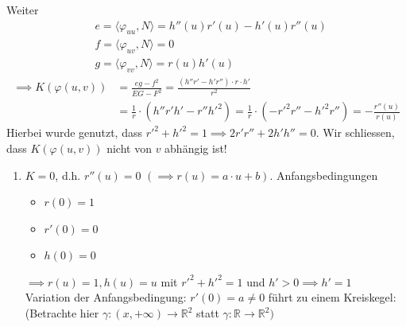 \documentclass[../main.tex]{subfiles}
\begin{document}
Weiter \begin{align*}
    &e = \langle\varphi_{uu},N\rangle = h''(u)r'(u)-h'(u)r''(u)\\
    &f = \langle\varphi_{uv},N\rangle = 0\\
    &g = \langle\varphi_{vv},N\rangle = r(u)h'(u)
\end{align*}
\begin{align*}
    \implies K(\varphi(u,v)) &= \frac{eg-f^{2}}{EG-F^{2}} = \frac{(h''r'-h'r'')\cdot r\cdot h'}{r^{2}}\\
    &= \frac{1}{r}\cdot (h''r'h'-r''h'^{2}) = \frac{1}{r}\cdot (-r'^{2}r''-h'^{2}r'') = -\frac{r''(u)}{r(u)}
\end{align*}
Hierbei wurde genutzt, dass $r'^{2} + h'^{2} = 1 \implies 2r'r'' + 2h'h'' = 0$. 
Wir schliessen, dass $K(\varphi(u,v))$ nicht von $v$ abhängig ist!
\begin{specialcase}
\leavevmode
\begin{enumerate}
    \item 
    \begin{minipage}[t]{0.8\columnwidth}
        $K=0$, d.h. $r''(u)=0$ $(\implies r(u)=a\cdot u+b)$.
        Anfangsbedingungen
        \begin{itemize}
            \item $r(0)=1$
            \item $r'(0)=0$
            \item $h(0)=0$
        \end{itemize}
        $\implies r(u)=1, h(u)=u$ mit $r'^{2}+h'^{2}=1$ und $h'>0 \implies h' = 1$\\
        Variation der Anfangsbedingung: $r'(0)=a \neq 0$ führt zu einem Kreiskegel:
        (Betrachte hier $\gamma:(x,+\infty)\rightarrow \mathbb{R}^{2}$ statt $\gamma:\mathbb{R}\rightarrow\mathbb{R}^{2})$
    \end{minipage}
    \hspace{0.05\linewidth}
    \begin{minipage}[t]{0.1\columnwidth}
        \begin{figure}[H]
            \centering
            \def\svgwidth{\textwidth}
            
        \end{figure}
    \end{minipage}


\end{enumerate}
\end{specialcase}
\end{document}
